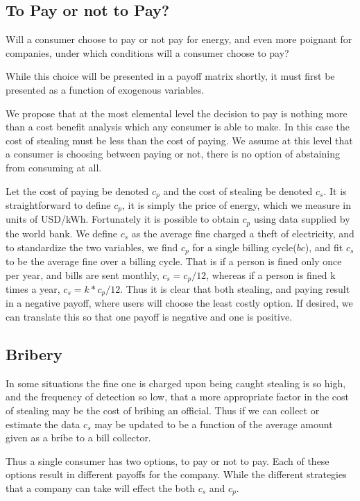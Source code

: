 \documentclass{article}
\begin{document}
\subsection{To Pay or not to Pay?}
Will a consumer choose to pay or not pay for energy, and even more poignant for companies, under which conditions will a consumer choose to pay?

While this choice will be presented in a payoff matrix shortly, it must first be presented as a function of exogenous variables.

We propose that at the most elemental level the decision to pay is nothing more than a cost benefit analysis which any consumer is able to make. In this case the cost of stealing must be less than the cost of paying. We assume at this level that a consumer is choosing between paying or not, there is no option of abstaining from consuming at all.

Let the cost of paying be denoted $c_p$ and the cost of stealing be denoted $c_s$. It is straightforward to define $c_p$, it is simply the price of energy, which we measure in units of USD/kWh. Fortunately it is possible to obtain $c_p$ using data supplied by the world bank. We define $c_s$ as the average fine charged a theft of electricity, and to standardize the two variables, we find $c_p$ for a single billing cycle($bc$), and fit $c_s$ to be the average fine over a billing cycle. That is if a person is fined only once per year, and bills are sent monthly, $c_s = c_p/12$, whereas if a person is fined k times a year, $c_s = k*c_p/12$. Thus it is clear that both stealing, and paying result in a negative payoff, where users will choose the least costly option. If desired, we can translate this so that one payoff is negative and one is positive. \\

\subsection{Bribery}
In some situations the fine one is charged upon being caught stealing is so high, and the frequency of detection so low, that a more appropriate factor in the cost of stealing may be the cost of bribing an official. Thus if we can collect or estimate the data $c_s$ may be updated to be a function of the average amount given as a bribe to a bill collector. 

Thus a single consumer has two options, to pay or not to pay. Each of these options result in different payoffs for the company. While the different strategies that a company can take will effect the both $c_s$ and $c_p$. 
\end{document}
